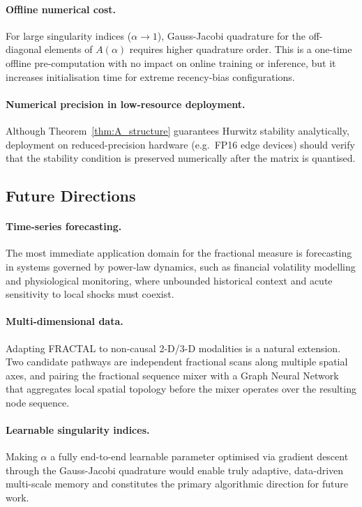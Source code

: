 \documentclass{article}
\theoremstyle{plain}
\theoremstyle{definition}
\theoremstyle{remark}
\begin{document}
\paragraph{Offline numerical cost.}
For large singularity indices ($\alpha \to 1$), Gauss-Jacobi quadrature for the
off-diagonal elements of $A(\alpha)$ requires higher quadrature order.
This is a one-time offline pre-computation with no impact on online training or
inference, but it increases initialisation time for extreme recency-bias
configurations.

\paragraph{Numerical precision in low-resource deployment.}
Although Theorem~\ref{thm:A_structure} guarantees Hurwitz stability
analytically, deployment on reduced-precision hardware (e.g.\ FP16 edge
devices) should verify that the stability condition is preserved numerically
after the matrix is quantised.

\subsection*{Future Directions}

\paragraph{Time-series forecasting.}
The most immediate application domain for the fractional measure is forecasting in systems
governed by power-law dynamics, such as financial volatility modelling and physiological
monitoring, where unbounded historical context and acute sensitivity to local shocks must
coexist.

\paragraph{Multi-dimensional data.}
Adapting FRACTAL to non-causal 2-D/3-D modalities is a natural extension.
Two candidate pathways are independent fractional scans along multiple spatial axes, and
pairing the fractional sequence mixer with a Graph Neural Network that aggregates local
spatial topology before the mixer operates over the resulting node sequence.

\paragraph{Learnable singularity indices.}
Making $\alpha$ a fully end-to-end learnable parameter optimised via gradient descent
through the Gauss-Jacobi quadrature would enable truly adaptive, data-driven multi-scale
memory and constitutes the primary algorithmic direction for future work.
\end{document}
